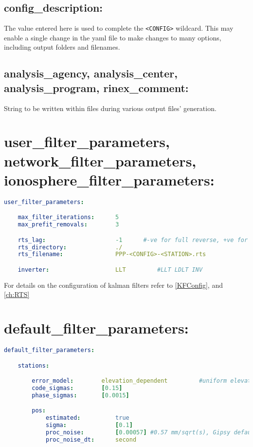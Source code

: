 \subsection*{config\_description:}

The value entered here is used to complete the \verb|<CONFIG>| wildcard.
This may enable a single change in the yaml file to make changes to many options, including output folders and filenames.

\subsection*{analysis\_agency, analysis\_center, analysis\_program, rinex\_comment:}

String to be written within files during various output files' generation.








\section{user\_filter\_parameters, network\_filter\_parameters, ionosphere\_filter\_parameters:}


\begin{lstlisting}[language=yaml,caption=Kalman Filter Configuration]
user_filter_parameters:

    max_filter_iterations:      5
    max_prefit_removals:        3

    rts_lag:                    -1      #-ve for full reverse, +ve for limited epochs
    rts_directory:              ./
    rts_filename:               PPP-<CONFIG>-<STATION>.rts

    inverter:                   LLT         #LLT LDLT INV

\end{lstlisting}

For details on the configuration of kalman filters refer to \ref{KFConfig}, and \ref{ch:RTS}










\section{default\_filter\_parameters:}



\begin{lstlisting}[language=yaml,caption=Default\_filter\_parameters]
default_filter_parameters:

    stations:

        error_model:        elevation_dependent         #uniform elevation_dependent
        code_sigmas:        [0.15]
        phase_sigmas:       [0.0015]

        pos:
            estimated:          true
            sigma:              [0.1]
            proc_noise:         [0.00057] #0.57 mm/sqrt(s), Gipsy default value from slow-moving
            proc_noise_dt:      second
\end{lstlisting}


